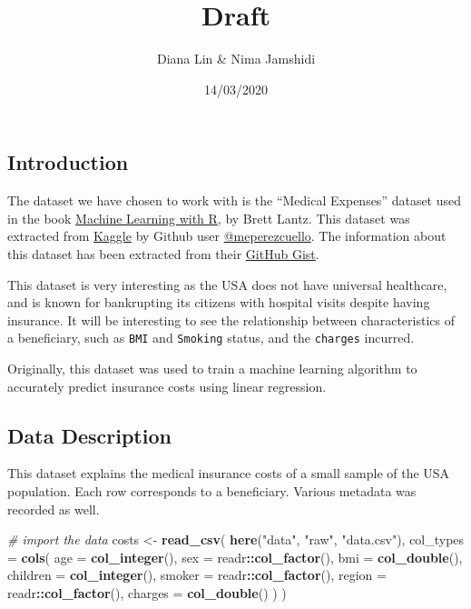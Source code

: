 \documentclass[]{article}
\title{Draft}
\author{Diana Lin \& Nima Jamshidi}
\date{14/03/2020}
\newenvironment{Shaded}{\begin{snugshade}}{\end{snugshade}}
\newcommand{\CommentTok}[1]{\textcolor[rgb]{0.56,0.35,0.01}{\textit{#1}}}
\newcommand{\DataTypeTok}[1]{\textcolor[rgb]{0.13,0.29,0.53}{#1}}
\newcommand{\KeywordTok}[1]{\textcolor[rgb]{0.13,0.29,0.53}{\textbf{#1}}}
\newcommand{\NormalTok}[1]{#1}
\newcommand{\OperatorTok}[1]{\textcolor[rgb]{0.81,0.36,0.00}{\textbf{#1}}}
\newcommand{\StringTok}[1]{\textcolor[rgb]{0.31,0.60,0.02}{#1}}
\begin{document}
\maketitle

\hypertarget{introduction}{%
\subsection{Introduction}\label{introduction}}

The dataset we have chosen to work with is the ``Medical Expenses''
dataset used in the book
\href{https://www.amazon.com/Machine-Learning-R-Brett-Lantz/dp/1782162143}{Machine
Learning with R}, by Brett Lantz. This dataset was extracted from
\href{https://www.kaggle.com/mirichoi0218/insurance/home}{Kaggle} by
Github user
\href{https://gist.github.com/meperezcuello}{@meperezcuello}. The
information about this dataset has been extracted from their
\href{https://gist.github.com/meperezcuello/82a9f1c1c473d6585e750ad2e3c05a41}{GitHub
Gist}.

This dataset is very interesting as the USA does not have universal
healthcare, and is known for bankrupting its citizens with hospital
visits despite having insurance. It will be interesting to see the
relationship between characteristics of a beneficiary, such as
\texttt{BMI} and \texttt{Smoking} status, and the \texttt{charges}
incurred.

Originally, this dataset was used to train a machine learning algorithm
to accurately predict insurance costs using linear regression.

\hypertarget{data-description}{%
\subsection{Data Description}\label{data-description}}

This dataset explains the medical insurance costs of a small sample of
the USA population. Each row corresponds to a beneficiary. Various
metadata was recorded as well.

\begin{Shaded}
\begin{Highlighting}[]
\CommentTok{# import the data }
\NormalTok{costs <-}\StringTok{ }\KeywordTok{read_csv}\NormalTok{(}
  \KeywordTok{here}\NormalTok{(}\StringTok{"data"}\NormalTok{, }\StringTok{"raw"}\NormalTok{, }\StringTok{"data.csv"}\NormalTok{),}
  \DataTypeTok{col_types =} \KeywordTok{cols}\NormalTok{(}
    \DataTypeTok{age =} \KeywordTok{col_integer}\NormalTok{(),}
    \DataTypeTok{sex =}\NormalTok{ readr}\OperatorTok{::}\KeywordTok{col_factor}\NormalTok{(),}
    \DataTypeTok{bmi =} \KeywordTok{col_double}\NormalTok{(),}
    \DataTypeTok{children =} \KeywordTok{col_integer}\NormalTok{(),}
    \DataTypeTok{smoker =}\NormalTok{ readr}\OperatorTok{::}\KeywordTok{col_factor}\NormalTok{(),}
    \DataTypeTok{region =}\NormalTok{ readr}\OperatorTok{::}\KeywordTok{col_factor}\NormalTok{(),}
    \DataTypeTok{charges =} \KeywordTok{col_double}\NormalTok{()}
\NormalTok{  )}
\NormalTok{)}
\end{Highlighting}
\end{Shaded}
\end{document}
